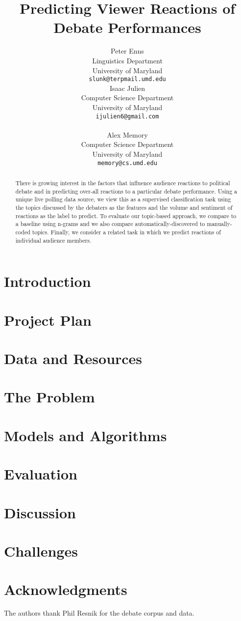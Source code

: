\documentclass[11pt]{article}
\title{Predicting Viewer Reactions of Debate Performances}
\author{Peter Enns \\
  Linguistics Department \\
  University of Maryland \\
  {\tt slunk@terpmail.umd.edu} \\\And
  Isaac Julien \\
  Computer Science Department \\
  University of Maryland \\
  {\tt ijulien6@gmail.com} \\ \\\And
  Alex Memory \\
  Computer Science Department \\
  University of Maryland \\
  {\tt memory@cs.umd.edu} \\
  }
\date{}
\begin{document}
\maketitle
\begin{abstract}
  There is growing interest in the factors that influence audience reactions to political debate and in predicting over-all reactions to a particular debate performance.  Using a unique live polling data source, we view this as a supervised classification task using the topics discussed by the debaters as the features and the volume and sentiment of reactions as the label to predict.  To evaluate our topic-based approach, we compare to a baseline using n-grams and we also compare automatically-discovered to manually-coded topics.  Finally, we consider a related task in which we predict reactions of individual audience members.
\end{abstract}

\section{Introduction}


\section{Project Plan}


\section{Data and Resources}


\section{The Problem}


\section{Models and Algorithms}


\section{Evaluation}
\label{sec:evaluation}


\section{Discussion}


\section{Challenges}


\section*{Acknowledgments}
The authors thank Phil Resnik for the debate corpus and data.



\end{document}
